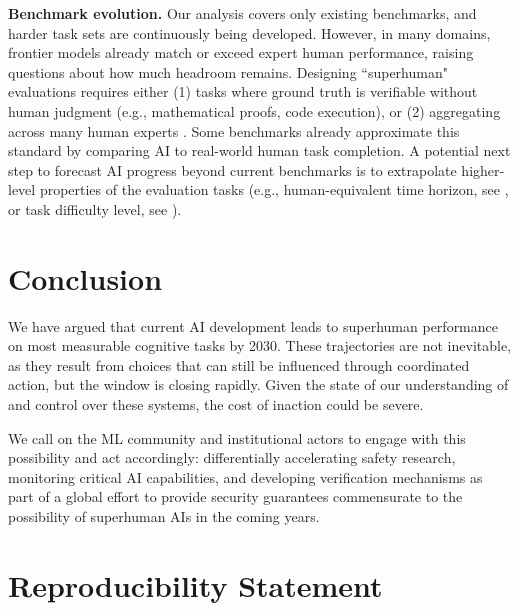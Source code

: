 \documentclass[letterpaper,twocolumn]{article}
\begin{document}
\textbf{Benchmark evolution.} Our analysis covers only existing benchmarks, and harder task sets are continuously being developed. However, in many domains, frontier models already match or exceed expert human performance, raising questions about how much headroom remains. Designing ``superhuman" evaluations requires either (1) tasks where ground truth is verifiable without human judgment (e.g., mathematical proofs, code execution), or (2) aggregating across many human experts \citep{phan_humanitys_2025}. Some benchmarks already approximate this standard by comparing AI to real-world human task completion. A potential next step to forecast AI progress beyond current benchmarks is to extrapolate higher-level properties of the evaluation tasks (e.g., human-equivalent time horizon, see \citet{kwa_measuring_2025}, or task difficulty level, see \citet{zhou_general_2025}).

\section{Conclusion}
\label{sec:conclusion}

We have argued that current AI development leads to superhuman performance on most measurable cognitive tasks by 2030. These trajectories are not inevitable, as they result from choices that can still be influenced through coordinated action, but the window is closing rapidly. Given the state of our understanding of and control over these systems, the cost of inaction could be severe.



We call on the ML community and institutional actors to engage with this possibility and act accordingly: differentially accelerating safety research, monitoring critical AI capabilities, and developing verification mechanisms as part of a global effort to provide security guarantees commensurate to the possibility of superhuman AIs in the coming years.

\section*{Reproducibility Statement}
\end{document}
